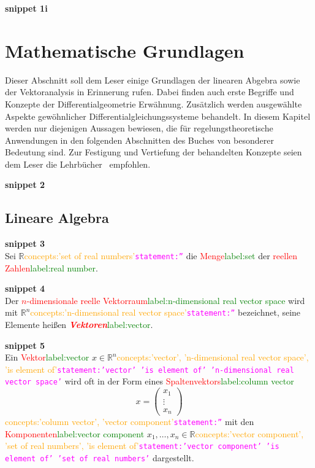 \documentclass[a4paper,twoside,english,ngerman,deutsch,german,sectrefs,envcountsame,envcountchap]{svmono}
\newcommand{\setref}[2]{\textcolor{red}{#1}\textcolor{green}{#2}}
\newcommand{\snippet}[1]{\textbf{snippet #1}\\}
\newcommand{\eqnote}[2]{\textcolor{orange}{#1}\textcolor{magenta}{\texttt{#2}}}
\begin{document}
\snippet{1i}


\chapter{Mathematische Grundlagen\label{cha:Grundlagen}}
Dieser Abschnitt soll dem Leser einige Grundlagen der linearen Abgebra sowie der Vektoranalysis in Erinnerung rufen. Dabei finden auch erste Begriffe und Konzepte der Differentialgeometrie Erwähnung. Zusätzlich werden ausgewählte Aspekte gewöhnlicher Differentialgleichungssysteme behandelt. In diesem Kapitel werden nur diejenigen Aussagen bewiesen, die für regelungstheoretische Anwendungen in den folgenden Abschnitten des Buches von besonderer Bedeutung sind. Zur Festigung und Vertiefung der behandelten Konzepte seien dem Leser die Lehrbücher~\cite{arnold2001,kerner2007} empfohlen.


\snippet{2}


\section{Lineare Algebra\label{sec:Lineare-Algebra}}


\snippet{3}
Sei ${\mathbb{R}}$\eqnote{concepts:'set of real numbers'}{statement:''} die \setref{Menge}{label:set} der \setref{reellen Zahlen}{label:real number}.

\snippet{4}
Der \setref{$n$-dimensionale reelle Vektorraum}{label:n-dimensional real vector space} wird mit ${\mathbb{R}}^{n}$\eqnote{concepts:'n-dimensional real vector space'}{statement:''} bezeichnet, seine Elemente heißen \setref{\textbf{\em Vektoren}}{label:vector}.

\snippet{5}
Ein \setref{Vektor}{label:vector} $x\in{\mathbb{R}}^{n}$\eqnote{concepts:'vector', 'n-dimensional real vector space', 'is element of'}{statement:'vector' 'is element of' 'n-dimensional real vector space'} wird oft in der Form eines \setref{Spaltenvektors}{label:column vector}
\begin{equation}
x=\left(\begin{array}{c} x_{1}\\
\vdots\\
x_{n}
\end{array}\right)\label{eq:vektor-x}
\end{equation}\eqnote{concepts:'column vector', 'vector component'}{statement:''}
mit den \setref{Komponenten}{label:vector component} $x_{1},\ldots,x_{n}\in{\mathbb{R}}$\eqnote{concepts:'vector component', 'set of real numbers', 'is element of'}{statement:'vector component' 'is element of' 'set of real numbers'} dargestellt.
\end{document}
